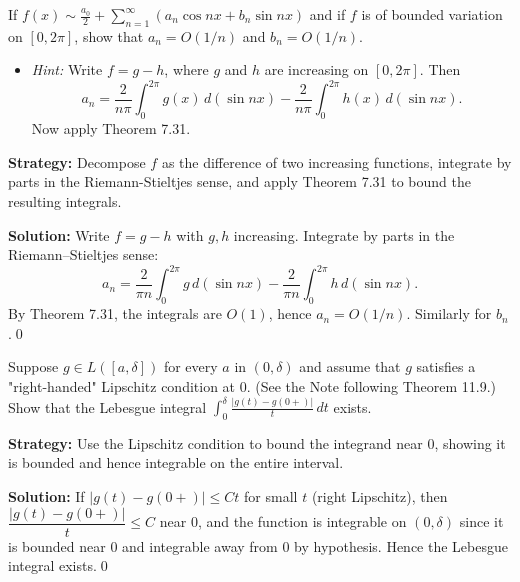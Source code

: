 \begin{problembox}
\begin{problemstatement}
If $f(x) \sim \frac{a_0}{2} + \sum_{n=1}^\infty (a_n \cos nx + b_n \sin nx)$ and if $f$ is of bounded variation on $[0, 2\pi]$, show that $a_n = O(1/n)$ and $b_n = O(1/n)$.
\begin{itemize}
\item \textit{Hint:} Write $f = g - h$, where $g$ and $h$ are increasing on $[0, 2\pi]$. Then
\[
a_n = \frac{2}{n\pi} \int_0^{2\pi} g(x) \, d(\sin nx) - \frac{2}{n\pi} \int_0^{2\pi} h(x) \, d(\sin nx).
\]
Now apply Theorem 7.31.
\end{itemize}
\end{problemstatement}
\end{problembox}

\noindent\textbf{Strategy:} Decompose $f$ as the difference of two increasing functions, integrate by parts in the Riemann-Stieltjes sense, and apply Theorem 7.31 to bound the resulting integrals.

\bigskip\noindent\textbf{Solution:}
Write $f=g-h$ with $g,h$ increasing. Integrate by parts in the Riemann–Stieltjes sense:
\[a_n=\frac{2}{\pi n}\int_0^{2\pi} g\,d(\sin nx)-\frac{2}{\pi n}\int_0^{2\pi} h\,d(\sin nx).\]
By Theorem 7.31, the integrals are $O(1)$, hence $a_n=O(1/n)$. Similarly for $b_n$.\qed


\begin{problembox}
\begin{problemstatement}
Suppose $g \in L([a, \delta])$ for every $a$ in $(0, \delta)$ and assume that $g$ satisfies a "right-handed" Lipschitz condition at 0. (See the Note following Theorem 11.9.) Show that the Lebesgue integral $\int_0^\delta \frac{|g(t) - g(0+)|}{t} \, dt$ exists.
\end{problemstatement}
\end{problembox}

\noindent\textbf{Strategy:} Use the Lipschitz condition to bound the integrand near 0, showing it is bounded and hence integrable on the entire interval.

\bigskip\noindent\textbf{Solution:}
If $|g(t)-g(0+)|\le C t$ for small $t$ (right Lipschitz), then $\dfrac{|g(t)-g(0+)|}{t}\le C$ near $0$, and the function is integrable on $(0,\delta)$ since it is bounded near $0$ and integrable away from $0$ by hypothesis. Hence the Lebesgue integral exists.\qed


